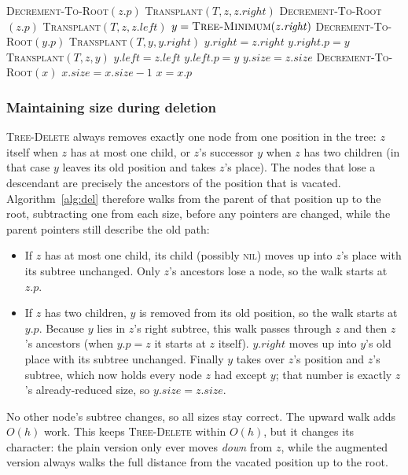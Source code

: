 \documentclass[conference]{IEEEtran}
\newcommand{\DEL}{\textsc{Tree-Delete}}
\newcommand{\TRANS}{\textsc{Transplant}}
\newcommand{\NIL}{\textsc{nil}}
\newcommand{\new}{\textcolor{blue!60!black}{$\blacktriangleleft$ new}}
\begin{document}
\begin{algorithm}[t]
\caption{\DEL{}$(T, z)$ with size maintenance}
\label{alg:del}
\begin{algorithmic}[1]
\If{$z.\mathit{left} == \NIL$}
  \State \textsc{Decrement-To-Root}$(z.p)$ \Comment{\new}
  \State \TRANS$(T, z, z.\mathit{right})$
\ElsIf{$z.\mathit{right} == \NIL$}
  \State \textsc{Decrement-To-Root}$(z.p)$ \Comment{\new}
  \State \TRANS$(T, z, z.\mathit{left})$
\Else
  \State $y = \textsc{Tree-Minimum}(z.\mathit{right})$
  \State \textsc{Decrement-To-Root}$(y.p)$ \Comment{\new}
    \State \TRANS$(T, y, y.\mathit{right})$
    \State $y.\mathit{right} = z.\mathit{right}$
    \State $y.\mathit{right}.p = y$
  \EndIf
  \State \TRANS$(T, z, y)$
  \State $y.\mathit{left} = z.\mathit{left}$
  \State $y.\mathit{left}.p = y$
  \State $y.\mathit{size} = z.\mathit{size}$ \Comment{\new}
\EndIf
\Statex
\Statex \textsc{Decrement-To-Root}$(x)$ \Comment{\new}
\While{$x \ne \NIL$}
  \State $x.\mathit{size} = x.\mathit{size} - 1$
  \State $x = x.p$
\EndWhile
\end{algorithmic}
\end{algorithm}

\subsubsection*{Maintaining size during deletion}
\DEL{} always removes exactly one node from one position in the tree: $z$
itself when $z$ has at most one child, or $z$'s successor $y$ when $z$ has two
children (in that case $y$ leaves its old position and takes $z$'s place). The
nodes that lose a descendant are precisely the ancestors of the position that
is vacated. Algorithm~\ref{alg:del} therefore walks from the parent of that
position up to the root, subtracting one from each size, before any pointers
are changed, while the parent pointers still describe the old path:
\begin{itemize}
\item If $z$ has at most one child, its child (possibly \NIL{}) moves up into
$z$'s place with its subtree unchanged. Only $z$'s ancestors lose a node, so
the walk starts at $z.p$.
\item If $z$ has two children, $y$ is removed from its old position, so the
walk starts at $y.p$. Because $y$ lies in $z$'s right subtree, this walk
passes through $z$ and then $z$'s ancestors (when $y.p = z$ it starts at $z$
itself). $y.\mathit{right}$ moves up into $y$'s old place with its subtree
unchanged. Finally $y$ takes over $z$'s position and $z$'s subtree, which now
holds every node $z$ had except $y$; that number is exactly $z$'s
already-reduced size, so $y.\mathit{size} = z.\mathit{size}$.
\end{itemize}
No other node's subtree changes, so all sizes stay correct. The upward walk
adds $O(h)$ work. This keeps \DEL{} within $O(h)$, but it changes its
character: the plain version only ever moves \emph{down} from $z$, while the
augmented version always walks the full distance from the vacated position up
to the root.
\end{document}
